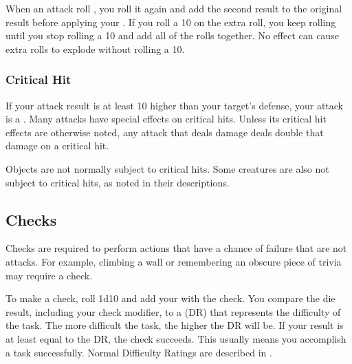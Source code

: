             When an attack roll , you roll it again and add the second result to the original result before applying your .
            If you roll a 10 on the extra roll, you keep rolling until you stop rolling a 10 and add all of the rolls together.
            No effect can cause extra rolls to explode without rolling a 10.

        \subsubsection{Critical Hit}\label{Critical Hit}
            If your attack result is at least 10 higher than your target's defense, your attack is a .
            Many attacks have special effects on critical hits.
            Unless its critical hit effects are otherwise noted, any attack that deals damage deals double that damage on a critical hit.

            Objects are not normally subject to critical hits.
            Some creatures are also not subject to critical hits, as noted in their descriptions.

    \subsection{Checks}\label{Checks}
        Checks are required to perform actions that have a chance of failure that are not attacks.
        For example, climbing a wall or remembering an obscure piece of trivia may require a check.

        To make a check, roll 1d10 and add your  with the check.
        You compare the die result, including your check modifier, to a  (DR) that represents the difficulty of the task.
        The more difficult the task, the higher the DR will be.
        If your result is at least equal to the DR, the check succeeds.
        This usually means you accomplish a task successfully.
        Normal Difficulty Ratings are described in .

